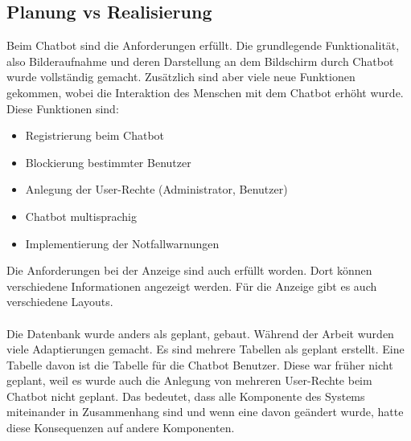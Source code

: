 \subsection{Planung vs Realisierung}
Beim Chatbot sind die Anforderungen erfüllt. Die grundlegende Funktionalität, also Bilderaufnahme und deren Darstellung an dem Bildschirm durch Chatbot wurde vollständig gemacht. Zusätzlich sind aber viele neue Funktionen gekommen, wobei die Interaktion des Menschen mit dem Chatbot erhöht wurde. \\
Diese Funktionen sind:
\begin{itemize}
	\item Registrierung beim Chatbot
\end{itemize}
\begin{itemize}
	\item Blockierung bestimmter Benutzer
\end{itemize}
\begin{itemize}
	\item Anlegung der User-Rechte (Administrator, Benutzer)
\end{itemize}
\begin{itemize}
	\item Chatbot multisprachig
\end{itemize}
\begin{itemize}
	\item Implementierung der Notfallwarnungen
\end{itemize}
Die Anforderungen bei der Anzeige sind auch erfüllt worden. Dort können verschiedene Informationen angezeigt werden. Für die Anzeige gibt es auch verschiedene Layouts. \\
\\
Die Datenbank wurde anders als geplant, gebaut. Während der Arbeit wurden viele Adaptierungen gemacht. Es sind mehrere Tabellen als geplant erstellt. Eine Tabelle davon ist die Tabelle für die Chatbot Benutzer. Diese war früher nicht geplant, weil es wurde auch die Anlegung von mehreren User-Rechte beim Chatbot nicht geplant. Das bedeutet, dass alle Komponente des Systems miteinander in Zusammenhang sind und wenn eine davon geändert wurde, hatte diese Konsequenzen auf andere Komponenten. 
